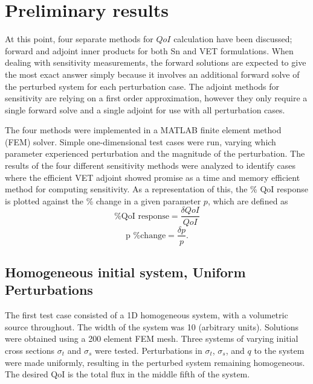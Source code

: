 \documentclass{article}
\newcommand{\sigt}{\sigma_t}
\newcommand{\sigs}{\sigma_s}
\newcommand{\scalSource}{q}
\newcommand{\qoi}{QoI}
\begin{document}
\section{Preliminary results}

At this point, four separate methods for $\qoi$ calculation have been discussed; forward and adjoint inner products for both Sn and VET formulations. When dealing with sensitivity measurements, the forward solutions are expected to give the most exact answer simply because it involves an additional forward solve of the perturbed system for each perturbation case. The adjoint methods for sensitivity are relying on a first order approximation, however they only require a single forward solve and a single adjoint for use with all perturbation cases. 

The four methods were implemented in a MATLAB finite element method (FEM) solver. Simple one-dimensional test  cases were run, varying which parameter experienced perturbation and the magnitude of the perturbation. The results of the four different sensitivity methods were analyzed to identify cases where the efficient VET adjoint showed promise as a time and memory efficient method for computing sensitivity. As a representation of this, the \% QoI response is plotted against the \% change in a given parameter $p$, which are defined as
\begin{equation}
\text{\% QoI response}=\frac{\delta QoI}{QoI}
\end{equation}
\begin{equation}
\text{p \% change}=\frac{\delta p}{p}.
\end{equation}    
\subsection{Homogeneous initial system, Uniform Perturbations}
The first test case consisted of a 1D homogeneous system, with a volumetric source throughout. The width of the system was 10 (arbitrary units). Solutions were obtained using a 200 element FEM mesh. Three systems of varying initial cross sections $\sigt$ and $\sigs$ were tested. Perturbations in $\sigt$, $\sigs$, and $\scalSource$ to the system were made uniformly, resulting in the perturbed system remaining homogeneous. The desired QoI is the total flux in the middle fifth of the system.
\end{document}
